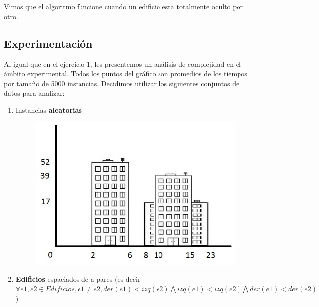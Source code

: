 \\
\\
Vimos que el algoritmo funcione cuando un edificio esta totalmente oculto por otro. 




\subsection{Experimentación}
Al igual que en el ejercicio 1, les presentemos un análisis de complejidad en el ámbito experimental. Todos los puntos del gráfico son promedios de los tiempos por tamaño de 5000 instancias. Decidimos utilizar los siguientes conjuntos de datos para analizar:

\begin{enumerate}
  \item Instancias \textbf{aleatorias}

\begin{figure}[H]
  \centering
    \includegraphics[scale=0.7]{./Imagenes/Ej1/ediRandom}
  \caption{}
  \label{fig:ejemplo}
\end{figure}  
    
  
  
  \item \textbf{Edificios} espaciados de a pares (es decir $\forall e1, e2 \in Edificios, e1 \neq e2, der(e1) < izq(e2) \bigwedge izq(e1) < izq(e2) \bigwedge der(e1) < der(e2)$ )
    

\end{enumerate}
